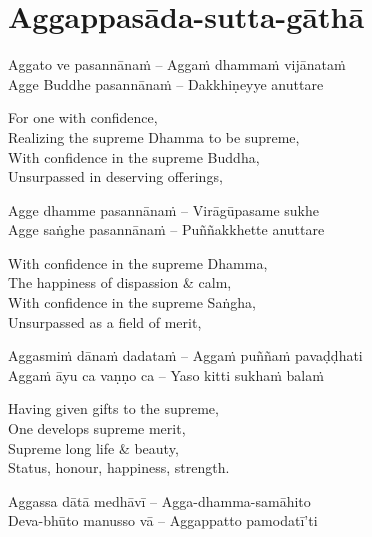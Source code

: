 \suttaRef{[MJG]}

\section{Aggappasāda-sutta-gāthā}
\label{aggappasada-sutta-gatha}

\begin{twochants}
  Aggato ve pasannānaṁ – Aggaṁ dhammaṁ vijānataṁ\\
  Agge Buddhe pasannānaṁ – Dakkhiṇeyye anuttare
\end{twochants}

\begin{english-verses}
  For one with confidence,\\
  Realizing the supreme Dhamma to be supreme,\\
  With confidence in the supreme Buddha,\\
  Unsurpassed in deserving offerings,
\end{english-verses}

\begin{twochants}
  Agge dhamme pasannānaṁ – Virāgūpasame sukhe\\
  Agge saṅghe pasannānaṁ – Puññakkhette anuttare
\end{twochants}

\begin{english-verses}
  With confidence in the supreme Dhamma,\\
  The happiness of dispassion \& calm,\\
  With confidence in the supreme Saṅgha,\\
  Unsurpassed as a field of merit,
\end{english-verses}

\begin{twochants}
  Aggasmiṁ dānaṁ dadataṁ – Aggaṁ puññaṁ pavaḍḍhati\\
  Aggaṁ āyu ca vaṇṇo ca – Yaso kitti sukhaṁ balaṁ
\end{twochants}

\begin{english-verses}
  Having given gifts to the supreme,\\
  One develops supreme merit,\\
  Supreme long life \& beauty,\\
  Status, honour, happiness, strength.
\end{english-verses}

\begin{twochants}
  Aggassa dātā medhāvī – Agga-dhamma-samāhito\\
  Deva-bhūto manusso vā – Aggappatto pamodatī'ti
\end{twochants}

